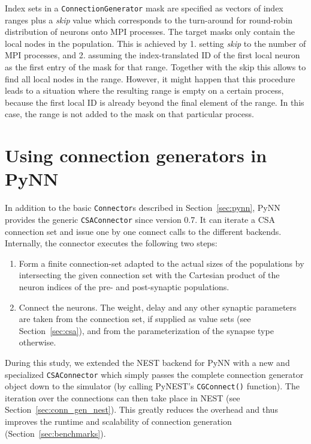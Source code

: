 \documentclass{frontiersSCNS} %
\begin{document}
Index sets in a \verb|ConnectionGenerator| mask are specified as
vectors of index ranges plus a \emph{skip} value which corresponds to
the turn-around for round-robin distribution of neurons onto MPI
processes.  The target masks only contain the local nodes in the
population. This is achieved by 1. setting \emph{skip} to the number
of MPI processes, and 2. assuming the index-translated ID of the first
local neuron as the first entry of the mask for that range. Together
with the skip this allows to find all local nodes in the
range. However, it might happen that this procedure leads to a
situation where the resulting range is empty on a certain process,
because the first local ID is already beyond the final element of the
range. In this case, the range is not added to the mask on that
particular process.



\section{Using connection generators in PyNN}\label{sec:conn_gen_pynn}

In addition to the basic \verb|Connector|s described in
Section~\ref{sec:pynn}, PyNN provides the generic \verb|CSAConnector|
since version 0.7. It can iterate a CSA connection set and issue one
by one connect calls to the different backends. Internally, the
connector executes the following two steps:

\begin{enumerate}
\item Form a finite connection-set adapted to the actual sizes of the
  populations by intersecting the given connection set with the
  Cartesian product of the neuron indices of the pre- and
  post-synaptic populations.
\item Connect the neurons. The weight, delay and any other synaptic
  parameters are taken from the connection set, if supplied as value
  sets (see Section~\ref{sec:csa}), and from the parameterization of
  the synapse type otherwise.
\end{enumerate}

During this study, we extended the NEST backend for PyNN with a new
and specialized \verb|CSAConnector| which simply passes the complete
connection generator object down to the simulator (by calling PyNEST's
\verb|CGConnect()| function). The iteration over the connections can
then take place in NEST (see Section~\ref{sec:conn_gen_nest}). This
greatly reduces the overhead and thus improves the runtime and
scalability of connection generation (Section~\ref{sec:benchmarks}).
\end{document}
